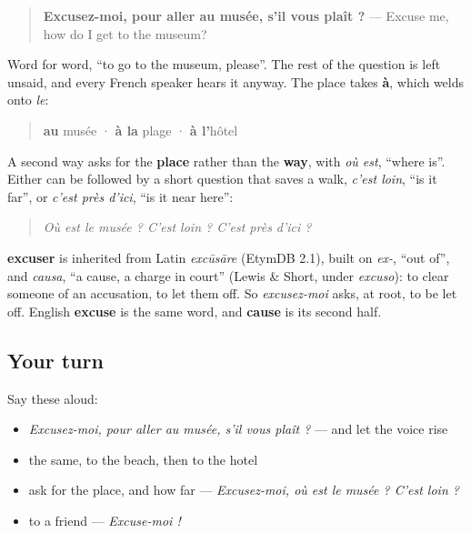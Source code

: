 \begin{grammarlens}[title={Grammar Lens: pour aller à…}]
\begin{quote}
\textbf{Excusez-moi, pour aller au musée, s'il vous plaît ?} — Excuse me, how do I get to the museum?
\end{quote}

Word for word, \textquotedblleft{}to go to the museum, please\textquotedblright{}. The rest of the question is left unsaid, and every French speaker hears it anyway. The place takes \textbf{à}, which welds onto \emph{le}:

\begin{quote}
\textbf{au} musée · \textbf{à la} plage · \textbf{à l'}hôtel
\end{quote}

A second way asks for the \textbf{place} rather than the \textbf{way}, with \emph{où est}, \textquotedblleft{}where is\textquotedblright{}. Either can be followed by a short question that saves a walk, \emph{c'est loin}, \textquotedblleft{}is it far\textquotedblright{}, or \emph{c'est près d'ici}, \textquotedblleft{}is it near here\textquotedblright{}:

\begin{quote}
\emph{Où est le musée ? C'est loin ? C'est près d'ici ?}
\end{quote}
\end{grammarlens}

\begin{cousinweb}
\textbf{excuser} is inherited from Latin \emph{excūsāre} (EtymDB 2.1), built on \emph{ex-}, \textquotedblleft{}out of\textquotedblright{}, and \emph{causa}, \textquotedblleft{}a cause, a charge in court\textquotedblright{} (Lewis \& Short, under \emph{excuso}): to clear someone of an accusation, to let them off. So \emph{excusez-moi} asks, at root, to be let off. English \textbf{excuse} is the same word, and \textbf{cause} is its second half.
\end{cousinweb}

\subsection*{Your turn}
Say these aloud:

\begin{itemize}
\raggedright
  \item \emph{Excusez-moi, pour aller au musée, s'il vous plaît ?} — and let the voice rise
  \item the same, to the beach, then to the hotel
  \item ask for the place, and how far — \emph{Excusez-moi, où est le musée ? C'est loin ?}
  \item to a friend — \emph{Excuse-moi !}
\end{itemize}

